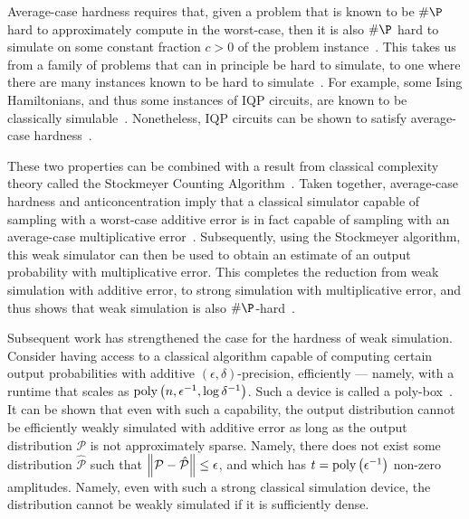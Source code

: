 Average-case hardness requires that, given a problem that is known to be $\#\P$ hard to approximately compute in the worst-case, then it is also $\#\P$ hard to simulate on some constant fraction $c>0$ of the problem instance~\cite{Bremner2016}. This takes us from a family of problems that can in principle be hard to simulate, to one where there are many instances known to be hard to simulate~\cite{Harrow2017}. For example, some Ising Hamiltonians, and thus some instances of IQP circuits, are known to be classically simulable~\cite{Fujii2017}. Nonetheless, IQP circuits can be shown to satisfy average-case hardness~\cite{Bremner2016}.\par
These two properties can be combined with a result from classical complexity theory called the Stockmeyer Counting Algorithm~\cite{Stockmeyer1985}. Taken together, average-case hardness and anticoncentration imply that a classical simulator capable of sampling with a worst-case additive error is in fact capable of sampling with an average-case multiplicative error~\cite{Bremner2016}. Subsequently, using the Stockmeyer algorithm, this weak simulator can then be used to obtain an estimate of an output probability with multiplicative error. This completes the reduction from weak simulation with additive error, to strong simulation with multiplicative error, and thus shows that weak simulation is also $\#\P$-hard~\cite{Bremner2016}.\par
Subsequent work has strengthened the case for the hardness of weak simulation. Consider having access to a classical algorithm capable of computing certain output probabilities with additive $\left(\epsilon,\delta\right)$-precision, efficiently --- namely, with a runtime that scales as $\text{poly}\left(n,\epsilon^{-1},\log\delta^{-1}\right)$. Such a device is called a poly-box~\cite{Pashayan2017}. It can be shown that even with such a capability, the output distribution cannot be efficiently weakly simulated with additive error as long as the output distribution $\mathcal{P}$ is not approximately sparse. Namely, there does not exist some distribution $\hat{\mathcal{P}}$ such that $\norm{\mathcal{P}-\mathcal{\hat{P}}}\leq \epsilon$, and which has $t=\text{poly}\left(\epsilon^{-1}\right)$ non-zero amplitudes. Namely, even with such a strong classical simulation device, the distribution cannot be weakly simulated if it is sufficiently dense.
